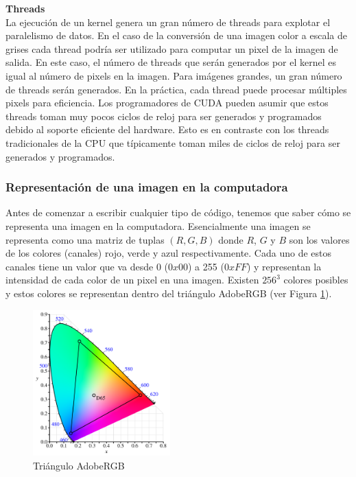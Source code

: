 \begin{tcolorbox}[colback=yellow,colframe=yellow!75!black,arc=0pt,outer arc=0pt]
  \textbf{Threads} \\

  La ejecución de un kernel genera un gran número de threads para explotar el paralelismo de datos. En el caso de la
  conversión de una imagen color a escala de grises cada thread podría ser utilizado para computar un pixel de la imagen
  de salida. En este caso, el número de threads que serán generados por el kernel es igual al número de pixels en la
  imagen. Para imágenes grandes, un gran número de threads serán generados. En la práctica, cada thread puede procesar
  múltiples pixels para eficiencia. Los programadores de CUDA pueden asumir que estos threads toman muy pocos ciclos de
  reloj para ser generados y programados debido al soporte eficiente del hardware. Esto es en contraste con los threads
  tradicionales de la CPU que típicamente toman miles de ciclos de reloj para ser generados y programados.
\end{tcolorbox}

\subsubsection{Representación de una imagen en la computadora}

Antes de comenzar a escribir cualquier tipo de código, tenemos que saber cómo se representa una imagen en la
computadora. Esencialmente una imagen se representa como una matriz de tuplas $(R, G, B)$ donde $R$, $G$ y $B$ son los
valores de los colores (canales) rojo, verde y azul respectivamente. Cada uno de estos canales tiene un valor que va
desde 0 ($0x00$) a 255 ($0xFF$) y representan la intensidad de cada color de un pixel en una imagen. Existen $256^3$
colores posibles y estos colores se representan dentro del triángulo AdobeRGB (ver Figura \ref{fig:adobe_rgb}).

\begin{figure}[H]
  \centering
  \includegraphics[width=200px]{./images/adobe_rgb.png}
  \caption{Triángulo AdobeRGB}
  \label{fig:adobe_rgb}
\end{figure}

